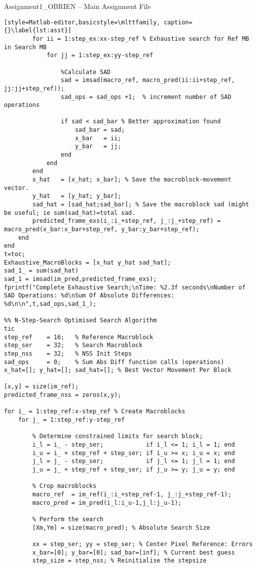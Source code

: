 \begin{codeblock}{Assignment1\_OBRIEN -- Main Assignment File}
\begin{lstlisting}[style=Matlab-editor,basicstyle=\mlttfamily, caption={}\label{lst:asst}]
        for ii = 1:step_ex:xx-step_ref % Exhaustive search for Ref MB in Search MB
            for jj = 1:step_ex:yy-step_ref

                %Calculate SAD
                sad = imsad(macro_ref, macro_pred(ii:ii+step_ref, jj:jj+step_ref));
                sad_ops = sad_ops +1;  % increment number of SAD operations

                if sad < sad_bar % Better approximation found
                    sad_bar = sad;
                    x_bar   = ii;
                    y_bar   = jj;
                end
            end
        end
        x_hat   = [x_hat; x_bar]; % Save the macroblock-movement vector.
        y_hat   = [y_hat; y_bar];
        sad_hat = [sad_hat;sad_bar]; % Save the macroblock sad (might be useful; ie sum(sad_hat)=total sad.
        predicted_frame_exs(i_:i_+step_ref, j_:j_+step_ref) =  macro_pred(x_bar:x_bar+step_ref, y_bar:y_bar+step_ref);
    end
end
t=toc;
Exhaustive_MacroBlocks = [x_hat y_hat sad_hat];
sad_1_ = sum(sad_hat)
sad_1 = imsad(im_pred,predicted_frame_exs);
fprintf("Complete Exhaustive Search;\nTime: %2.3f seconds\nNumber of SAD Operations: %d\nSum Of Absolute Differences: %d\n\n",t,sad_ops,sad_1_);

%% N-Step-Search Optimised Search Algorithm
tic
step_ref    = 16;   % Reference Macroblock
step_ser    = 32;   % Search Macroblock
step_nss    = 32;   % NSS Init Steps
sad_ops     = 0;    % Sum Abs Diff function calls (operations)
x_hat=[]; y_hat=[]; sad_hat=[]; % Best Vector Movement Per Block

[x,y] = size(im_ref);
predicted_frame_nss = zeros(x,y);

for i_ = 1:step_ref:x-step_ref % Create Macroblocks
    for j_ = 1:step_ref:y-step_ref 

        % Determine constrained limits for search block; 
        i_l = i_ - step_ser;            if i_l <= 1; i_l = 1; end
        i_u = i_ + step_ref + step_ser; if i_u >= x; i_u = x; end
        j_l = j_ - step_ser;            if j_l <= 1; j_l = 1; end
        j_u = j_ + step_ref + step_ser; if j_u >= y; j_u = y; end

        % Crop macroblocks
        macro_ref  = im_ref(i_:i_+step_ref-1, j_:j_+step_ref-1);
        macro_pred = im_pred(i_l:i_u-1,j_l:j_u-1);

        % Perform the search
        [Xm,Ym] = size(macro_pred); % Absolute Search Size

        xx = step_ser; yy = step_ser; % Center Pixel Reference: Errors
        x_bar=[0]; y_bar=[0]; sad_bar=[inf]; % Current best guess
        step_size = step_nss; % Reinitialise the stepsize


\end{lstlisting}
\end{codeblock}
